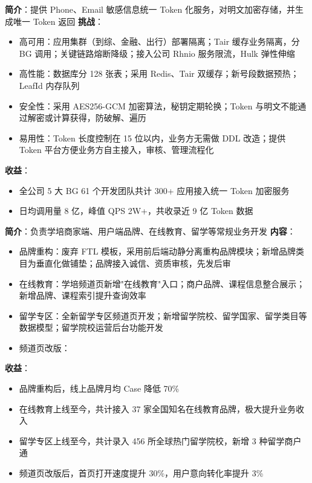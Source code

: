\documentclass{resume}
\begin{document}
    \begin{onehalfspacing}
        \textbf{简介}：提供 Phone、Email 敏感信息统一 Token 化服务，对明文加密存储，并生成唯一 Token 返回\newline
        \textbf{挑战}：
        \begin{itemize}
            \item 高可用：应用集群（到综、金融、出行）部署隔离；Tair 缓存业务隔离，分 BG 调用；关键链路熔断降级；接入公司 Rhnio 服务限流，Hulk 弹性伸缩
            \item 高性能：数据库分 128 张表；采用 Redis、Tair 双缓存；新号段数据预热；LeafId 内存队列
            \item 安全性：采用 AES256-GCM 加密算法，秘钥定期轮换；Token 与明文不能通过解密或计算获得，防破解、遍历
            \item 易用性：Token 长度控制在 15 位以内，业务方无需做 DDL 改造；提供 Token 平台方便业务方自主接入，审核、管理流程化
        \end{itemize}
        \textbf{收益}：
        \begin{itemize}
            \item 全公司 5 大 BG 61 个开发团队共计 300+ 应用接入统一 Token 加密服务
            \item 日均调用量 8 亿，峰值 QPS 2W+，共收录近 9 亿 Token 数据
        \end{itemize}
    \end{onehalfspacing}
    \blankline{ }

    \begin{onehalfspacing}
        \textbf{简介}：负责学培商家端、用户端品牌、在线教育、留学等常规业务开发\newline
        \textbf{内容}：
        \begin{itemize}
            \item 品牌重构：废弃 FTL 模板，采用前后端动静分离重构品牌模块；新增品牌类目为垂直化做铺垫；品牌接入诚信、资质审核，先发后审
            \item 在线教育：学培频道页新增"在线教育"入口；商户品牌、课程信息整合展示；新增品牌、课程索引提升查询效率
            \item 留学专区：全新留学专区频道页开发；新增留学院校、留学国家、留学类目等数据模型；留学院校运营后台功能开发
            \item 频道页改版：
        \end{itemize}
        \textbf{收益}：
        \begin{itemize}
            \item 品牌重构后，线上品牌月均 Case 降低 70\%
            \item 在线教育上线至今，共计接入 37 家全国知名在线教育品牌，极大提升业务收入
            \item 留学专区上线至今，共计录入 456 所全球热门留学院校，新增 3 种留学商户通
            \item 频道页改版后，首页打开速度提升 30\%，用户意向转化率提升 3\%
        \end{itemize}
    \end{onehalfspacing}
    \blankline{ }
\end{document}

